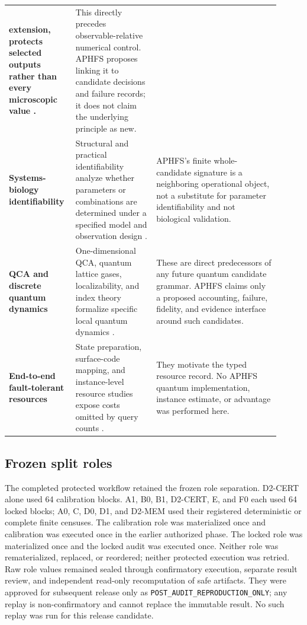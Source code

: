 \begin{longtable}{>{\bfseries}p{0.19\linewidth}p{0.29\linewidth}p{0.43\linewidth}}
extension, protects selected outputs rather than every microscopic value
\citep{prudhomme1999goal,oden2005lattice}. & This directly precedes observable-relative numerical
control. APHFS proposes linking it to candidate decisions and failure records; it does not claim
the underlying principle as new.\\
Systems-biology identifiability & Structural and practical identifiability analyze whether
parameters or combinations are determined under a specified model and observation design
\citep{bellman1970identifiability,chis2011,gutenkunst2007,raue2009,villaverde2016}. & APHFS's
finite whole-candidate signature is a neighboring operational object, not a substitute for
parameter identifiability and not biological validation.\\
QCA and discrete quantum dynamics & One-dimensional QCA, quantum lattice gases, localizability,
and index theory formalize specific local quantum dynamics
\citep{watrous1995qca,meyer1996qca,arrighi2011localizability,gross2012qcaindex}. & These are direct
predecessors of any future quantum candidate grammar. APHFS claims only a proposed accounting,
failure, fidelity, and evidence interface around such candidates.\\
End-to-end fault-tolerant resources & State preparation, surface-code mapping, and instance-level
resource studies expose costs omitted by query counts
\citep{pleschbrukner2011,fowler2012surface,gidneyekera2021,lowchuang2019,reiher2017,
liu2024,eklund2026}. & They motivate
the typed resource record. No APHFS quantum implementation, instance estimate, or advantage was
performed here.\\
\bottomrule
\end{longtable}

\subsection{Frozen split roles}
\label{supp:splits}

The completed protected workflow retained the frozen role separation. D2-CERT alone used 64
calibration blocks. A1, B0, B1, D2-CERT, E, and F0 each used 64 locked blocks; A0, C, D0, D1,
and D2-MEM used their registered deterministic or complete finite censuses. The calibration role
was materialized once and calibration was executed once in the earlier authorized phase. The
locked role was materialized once and the locked audit was executed once. Neither role was
rematerialized, replaced, or reordered; neither protected execution was retried. Raw role values
remained sealed through confirmatory execution, separate result review, and independent read-only
recomputation of safe artifacts. They were approved
for subsequent release only as \texttt{POST\_AUDIT\_REPRODUCTION\_ONLY}; any replay is
non-confirmatory and cannot replace the immutable result. No such replay was run for this release
candidate.

